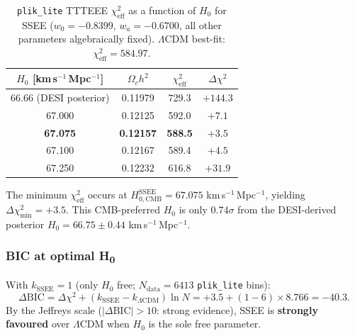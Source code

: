 \documentclass[12pt,a4paper]{article}
\begin{document}
\begin{table}[ht]
\centering
\caption{\texttt{plik\_lite} TTTEEE $\chi^2_\mathrm{eff}$ as a function of $H_0$ for SSEE ($w_0=-0.8399$, $w_a=-0.6700$, all other parameters algebraically fixed). $\Lambda$CDM best-fit: $\chi^2_\mathrm{eff}=584.97$.}
\label{tab:h0scan}
\begin{tabular}{cccc}
\toprule
$H_0$ [km\,s$^{-1}$\,Mpc$^{-1}$] & $\Omega_c h^2$ & $\chi^2_\mathrm{eff}$ & $\Delta\chi^2$ \\
\midrule
66.66 (DESI posterior) & 0.11979 & 729.3 & $+144.3$ \\
67.000 & 0.12125 & 592.0 & $+7.1$ \\
\textbf{67.075} & \textbf{0.12157} & \textbf{588.5} & $\mathbf{+3.5}$ \\
67.100 & 0.12167 & 589.4 & $+4.5$ \\
67.250 & 0.12232 & 616.8 & $+31.9$ \\
\bottomrule
\end{tabular}
\end{table}

The minimum $\chi^2_\mathrm{eff}$ occurs at $H_{0,\mathrm{CMB}}^\mathrm{SSEE} = 67.075$ km\,s$^{-1}$\,Mpc$^{-1}$, yielding $\Delta\chi^2_\mathrm{min} = +3.5$. This CMB-preferred $H_0$ is only $0.74\sigma$ from the DESI-derived posterior $H_0 = 66.75\pm0.44$ km\,s$^{-1}$\,Mpc$^{-1}$.

\subsubsection*{BIC at optimal H\textsubscript{0}}

With $k_\mathrm{SSEE}=1$ (only $H_0$ free; $N_\mathrm{data}=6413$ \texttt{plik\_lite} bins):
\begin{equation}
  \Delta\mathrm{BIC} = \Delta\chi^2 + (k_\mathrm{SSEE} - k_{\Lambda\mathrm{CDM}})\ln N
  = +3.5 + (1-6)\times 8.766 = -40.3.
\end{equation}
By the Jeffreys scale ($|\Delta\mathrm{BIC}|>10$: strong evidence), SSEE is \textbf{strongly favoured} over $\Lambda$CDM when $H_0$ is the sole free parameter.
\end{document}
